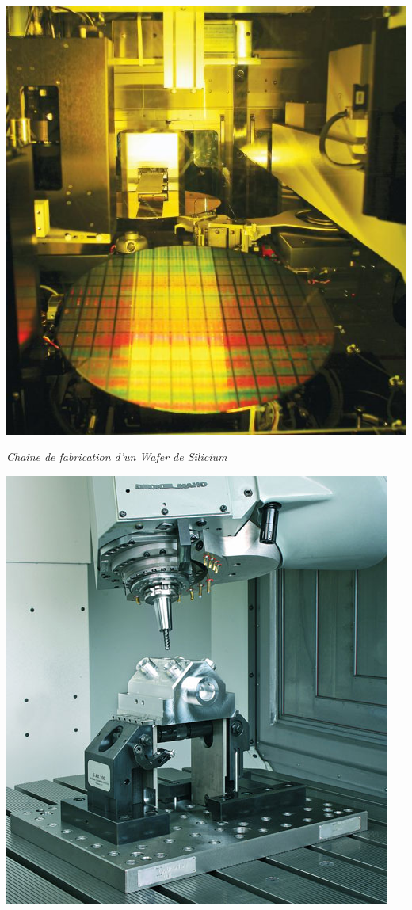 \documentclass[11pt,oneside]{article}
\begin{document}
\begin{exemple}

\begin{minipage}[c]{.22\linewidth}
\begin{center}
\includegraphics[width=.95\textwidth]{png/wafer2}

\textit{Chaîne de fabrication d'un Wafer de Silicium}\cite{wafer}
\end{center}
\end{minipage}
\hfill
\begin{minipage}[c]{.22\linewidth}
\begin{center}
\includegraphics[width=.95\textwidth]{png/usinage}


\end{center}
\end{minipage}
\end{exemple}
\end{document}
